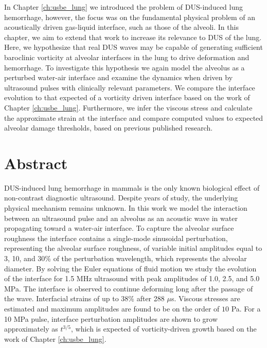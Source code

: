 In Chapter \ref{ch:usbe_lung} we introduced the problem of
\ac{DUS}-induced lung hemorrhage, however, the focus was on the
fundamental physical problem of an acoustically driven gas-liquid
interface, such as those of the alveoli. In this chapter, we aim to
extend that work to increase its relevance to \ac{DUS} of the
lung. Here, we hypothesize that real \ac{DUS} waves may be capable of
generating sufficient baroclinic vorticity at alveolar interfaces in
the lung to drive deformation and hemorrhage. To investigate this
hypothesis we again model the alveolus as a perturbed water-air
interface and examine the dynamics when driven by ultrasound pulses
with clinically relevant parameters. We compare the interface
evolution to that expected of a vorticity driven interface based on
the work of Chapter \ref{ch:usbe_lung}. Furthermore, we infer the
viscous stress and calculate the approximate strain at the interface
and compare computed values to expected alveolar damage thresholds,
based on previous published research.

\section{Abstract}
\ac{DUS}-induced lung hemorrhage in mammals is the only known
biological effect of non-contrast diagnostic ultrasound. Despite years
of study, the underlying physical mechanism remains unknown. In this
work we model the interaction between an ultrasound pulse and an
alveolus as an acoustic wave in water propagating toward a water-air
interface. To capture the alveolar surface roughness the interface
contains a single-mode sinusoidal perturbation, representing the
alveolar surface roughness, of variable initial amplitudes equal to 3,
10, and 30\% of the perturbation wavelength, which represents the
alveolar diameter. By solving the Euler equations of fluid motion we
study the evolution of the interface for 1.5 MHz ultrasound with peak
amplitudes of 1.0, 2.5, and 5.0 MPa. The interface is observed to
continue deforming long after the passage of the wave. Interfacial
strains of up to 38\% after 288 $\mu$s. Viscous stresses are estimated
and maximum amplitudes are found to be on the order of $10$ Pa. For a
10 MPa pulse, interface perturbation amplitudes are shown to grow
approximately as $t^{3/5}$, which is expected of vorticity-driven
growth based on the work of Chapter \ref{ch:usbe_lung}.

